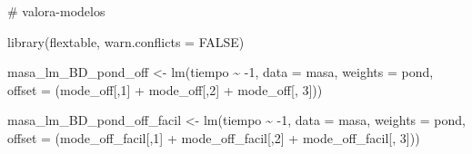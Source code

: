 \documentclass[
  letterpaper,
  DIV=11,
  numbers=noendperiod]{scrartcl}
\newenvironment{Shaded}{\begin{snugshade}}{\end{snugshade}}
\newcommand{\AttributeTok}[1]{\textcolor[rgb]{0.40,0.45,0.13}{#1}}
\newcommand{\CommentTok}[1]{\textcolor[rgb]{0.37,0.37,0.37}{#1}}
\newcommand{\ConstantTok}[1]{\textcolor[rgb]{0.56,0.35,0.01}{#1}}
\newcommand{\DecValTok}[1]{\textcolor[rgb]{0.68,0.00,0.00}{#1}}
\newcommand{\FunctionTok}[1]{\textcolor[rgb]{0.28,0.35,0.67}{#1}}
\newcommand{\NormalTok}[1]{\textcolor[rgb]{0.00,0.23,0.31}{#1}}
\newcommand{\OtherTok}[1]{\textcolor[rgb]{0.00,0.23,0.31}{#1}}
\newcommand{\SpecialCharTok}[1]{\textcolor[rgb]{0.37,0.37,0.37}{#1}}
\begin{document}
\begin{Shaded}
\begin{Highlighting}[]
\CommentTok{\# valora{-}modelos}

\FunctionTok{library}\NormalTok{(flextable, }\AttributeTok{warn.conflicts =} \ConstantTok{FALSE}\NormalTok{)}

\NormalTok{masa\_lm\_BD\_pond\_off }\OtherTok{\textless{}{-}} \FunctionTok{lm}\NormalTok{(tiempo }\SpecialCharTok{\textasciitilde{}} \SpecialCharTok{{-}}\DecValTok{1}\NormalTok{, }\AttributeTok{data =}\NormalTok{ masa, }
                        \AttributeTok{weights =}\NormalTok{ pond, }
                        \AttributeTok{offset =}\NormalTok{ (mode\_off[,}\DecValTok{1}\NormalTok{] }\SpecialCharTok{+}\NormalTok{ mode\_off[,}\DecValTok{2}\NormalTok{] }\SpecialCharTok{+} 
\NormalTok{                                  mode\_off[, }\DecValTok{3}\NormalTok{]))}

\NormalTok{masa\_lm\_BD\_pond\_off\_facil }\OtherTok{\textless{}{-}} \FunctionTok{lm}\NormalTok{(tiempo }\SpecialCharTok{\textasciitilde{}} \SpecialCharTok{{-}}\DecValTok{1}\NormalTok{, }\AttributeTok{data =}\NormalTok{ masa, }
                        \AttributeTok{weights =}\NormalTok{ pond, }
                        \AttributeTok{offset =}\NormalTok{ (mode\_off\_facil[,}\DecValTok{1}\NormalTok{] }\SpecialCharTok{+}\NormalTok{ mode\_off\_facil[,}\DecValTok{2}\NormalTok{] }\SpecialCharTok{+} 
\NormalTok{                                  mode\_off\_facil[, }\DecValTok{3}\NormalTok{]))}


\end{Highlighting}
\end{Shaded}
\end{document}
